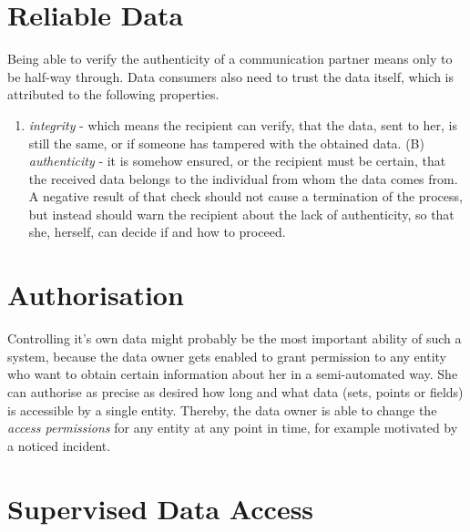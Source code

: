 \documentclass[12pt,english,a4paper,titlepage,cleardoublepage=empty,dottedtoc]{report}
\providecommand{\tightlist}{%
  \setlength{\itemsep}{0pt}\setlength{\parskip}{0pt}}
\begin{document}
\section{Reliable Data}\label{reliable-data}

Being able to verify the authenticity of a communication partner means
only to be half-way through. Data consumers also need to trust the data
itself, which is attributed to the following properties.

\begin{enumerate}
\def\labelenumi{(\Alph{enumi})}
\tightlist
\item
  \emph{integrity} - which means the recipient can verify, that the
  data, sent to her, is still the same, or if someone has tampered with
  the obtained data. (B) \emph{authenticity} - it is somehow ensured, or
  the recipient must be certain, that the received data belongs to the
  individual from whom the data comes from. A negative result of that
  check should not cause a termination of the process, but instead
  should warn the recipient about the lack of authenticity, so that she,
  herself, can decide if and how to proceed.
\end{enumerate}

\section{Authorisation}\label{authorisation}

Controlling it's own data might probably be the most important ability
of such a system, because the data owner gets enabled to grant
permission to any entity who want to obtain certain information about
her in a semi-automated way. She can authorise as precise as desired how
long and what data (sets, points or fields) is accessible by a single
entity. Thereby, the data owner is able to change the \emph{access
permissions} for any entity at any point in time, for example motivated
by a noticed incident.

\section{Supervised Data Access}\label{supervised-data-access}
\end{document}
